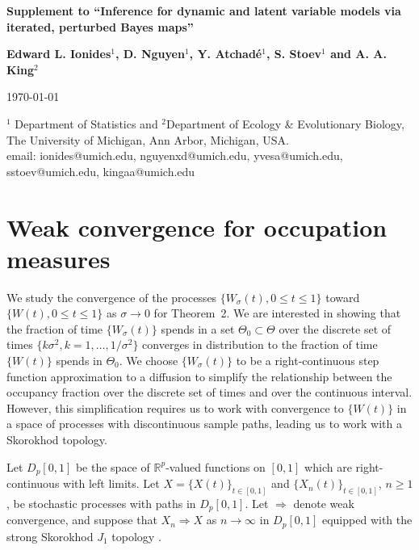 \documentclass[11pt]{article}
\newcommand{\bbTheta}{\Theta}
\def\R{\mathbb{R}}
\newcommand\Thetaspace{{\bbTheta}}
\begin{document}
\begin{center}
{\bf \Large 
Supplement to ``Inference for dynamic and latent variable models via iterated, perturbed Bayes maps''
}
\end{center}
\bigskip
\begin{center}
\textbf{Edward L. Ionides$^1$, D. Nguyen$^1$, Y. Atchad\'{e}$^1$, S. Stoev$^1$ and A. A. King$^2$}
 
\vspace{3mm}
\today
\vspace{3mm}

{\small 
$^1$ Department of Statistics and $^2$Department of Ecology \& Evolutionary Biology,\\
The University of Michigan, Ann Arbor, Michigan, USA.  \\
email: ionides@umich.edu, nguyenxd@umich.edu, yvesa@umich.edu, sstoev@umich.edu, kingaa@umich.edu

\medskip

}
\end{center}

\vspace{4cm}


\tableofcontents

\newpage

\section{Weak convergence for occupation measures}
We study the convergence of the processes $\{W_\sigma(t),0\le t\le 1\}$ toward $\{W(t),0\le t\le 1\}$ as $\sigma\to 0$ for Theorem~2.
We are interested in showing that the fraction of time $\{W_\sigma(t)\}$ spends in a set $\Thetaspace_0\subset\Thetaspace$ over the discrete set of times $\{k\sigma^2,k=1,\dots,1/\sigma^2\}$ converges in distribution to the fraction of time $\{W(t)\}$ spends in  $\Thetaspace_0$.
We choose $\{W_\sigma(t)\}$ to be a right-continuous step function approximation to a diffusion to simplify the relationship between the occupancy fraction over the discrete set of times and over the continuous interval.
However, this simplification requires us to work with convergence to $\{W(t)\}$ in a space of processes with discontinuous sample paths, leading us to work with a Skorokhod topology.

Let $D_p[0,1]$ be the space of $\R^p$-valued functions on $[0,1]$ which are right-continuous with left limits.
Let $X= \{X(t)\}_{t\in [0,1]}$ and $\{X_n(t)\}_{t\in [0,1]}$, $n\ge 1$, be  stochastic processes with paths in $D_p[0,1]$. 
Let $\Rightarrow$ denote weak convergence, and suppose that $X_n\Rightarrow X$ as $n\to\infty$ in $D_p[0,1]$ equipped with the strong Skorokhod $J_1$ topology \cite{jacod87}.
\end{document}

